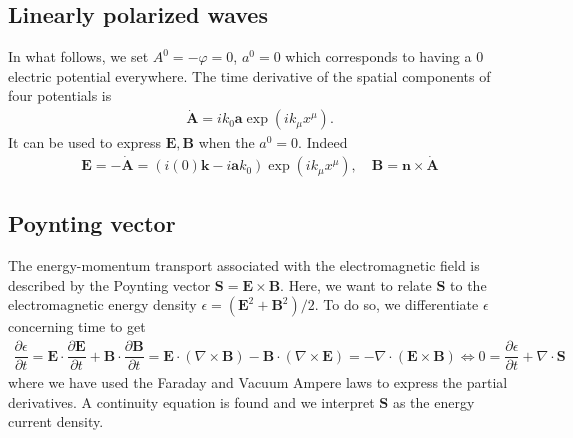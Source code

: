 \documentclass[10pt, a4paper]{article}
\begin{document}
{\subsection{Linearly polarized waves}

In what follows, we set $A^0 = -\varphi = 0$, $a^0 = 0$ which corresponds to having a $0$ electric potential everywhere. The time derivative of the spatial components of four potentials is
\begin{align*} 
    \dot{\mathbf{A}} = i k_0 \mathbf{a} \exp \left(i k_\mu x^\mu\right).
\end{align*}
It can be used to express $\mathbf{E}, \mathbf{B}$ when the $a^0 = 0$. Indeed
\begin{align*}
    \mathbf{E} =  -\mathbf{\dot{A}} =  (i (0) \mathbf{k} - i\mathbf{a} k_0)  \exp \left(i k_\mu x^\mu\right),\quad \mathbf{B} =  \mathbf{n} \times \dot{\mathbf{A}}
\end{align*}
\subsection{Poynting vector}
The energy-momentum transport associated with the electromagnetic field is described by the Poynting vector $\mathbf{S} = \mathbf{E} \times \mathbf{B}$. Here, we want to relate $\mathbf{S}$ to the electromagnetic energy density $\epsilon = (\mathbf{E}^2 +  \mathbf{B}^2)/2$. To do so, we differentiate $\epsilon$ concerning time to get 
\begin{align*}
    \dfrac{\partial \epsilon}{\partial t} = \mathbf{E} \cdot \dfrac{\partial \mathbf{E}}{\partial t} + \mathbf{B} \cdot \dfrac{\partial \mathbf{B}}{\partial t} = \mathbf{E} \cdot \left(\nabla \times \mathbf{B}\right) - \mathbf{B} \cdot \left(\nabla \times \mathbf{E}\right) = - \nabla  \cdot \left(\mathbf{E} \times \mathbf{B}\right) \iff 0 = \dfrac{\partial \epsilon}{\partial t} + \nabla  \cdot \mathbf{S}
\end{align*}
where we have used the Faraday and Vacuum Ampere laws to express the partial derivatives. A continuity equation is found and we interpret $\mathbf{S}$ as the energy current density. 

}
\end{document}
